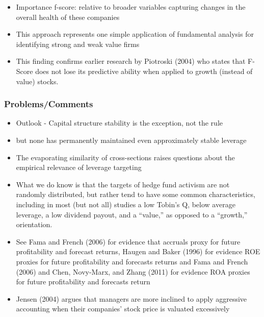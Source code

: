 \documentclass[12pt]{article}
\begin{document}
\begin{itemize}
            \item Importance f-score: relative to broader variables capturing changes in the overall health of these companies \citep{Piotroski2000}

            \item This approach represents one simple application of fundamental analysis for identifying strong and weak value firms \citep{Piotroski2000}

            \item This finding confirms earlier research by Piotroski (2004) who states that F-Score does not lose its predictive ability when applied to growth (instead of value) stocks. \citep{Mohr2012}

        \end{itemize}

    \subsubsection{Problems/Comments}

        \begin{itemize}

            \item Outlook - Capital structure stability is the exception, not the rule \citep{Deangelo2015}

            \item but none has permanently maintained even approximately stable leverage \citep{Deangelo2015}

            \item The evaporating similarity of cross-sections raises questions about the empirical relevance of leverage targeting \citep{Deangelo2015}

            \item What we do know is that the targets of hedge fund activism are not randomly distributed, but rather tend to have some common characteristics, including in most (but not all) studies a low Tobin’s Q, below average leverage, a low dividend payout, and a “value,” as opposed to a “growth,” orientation. \citep{CoffeeJr.2014}


            \item See Fama and French (2006) for evidence that accruals proxy for future profitability and forecast returns, Haugen and Baker (1996) for evidence ROE proxies for future profitability and forecasts returns and Fama and French (2006) and Chen, Novy-Marx, and Zhang (2011) for evidence ROA proxies for future profitability and forecasts return \citep{Choi2012}
            
            \item Jensen (2004) argues that managers are more inclined to apply aggressive accounting when their companies’ stock price is valuated excessively \citep{Mohr2012}
        \end{itemize}
\end{document}
